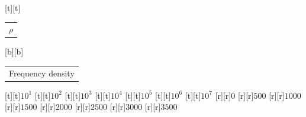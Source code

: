 %    
%
%
\begin{psfrags}%
\psfragscanon%
%
[t][t]{\color[rgb]{0,0,0}\setlength{\tabcolsep}{0pt}\begin{tabular}{c}{\Large$\rho$}\end{tabular}}%
[b][b]{\color[rgb]{0,0,0}\setlength{\tabcolsep}{0pt}\begin{tabular}{c}{\Large Frequency density}\end{tabular}}%
%
[t][t]{$10^1$}%
[t][t]{$10^2$}%
[t][t]{$10^3$}%
[t][t]{$10^4$}%
[t][t]{$10^5$}%
[t][t]{$10^6$}%
[t][t]{$10^7$}%
%
[r][r]{$0$}%
[r][r]{$500$}%
[r][r]{$1000$}%
[r][r]{$1500$}%
[r][r]{$2000$}%
[r][r]{$2500$}%
[r][r]{$3000$}%
[r][r]{$3500$}%
%
%
\end{psfrags}%
%

